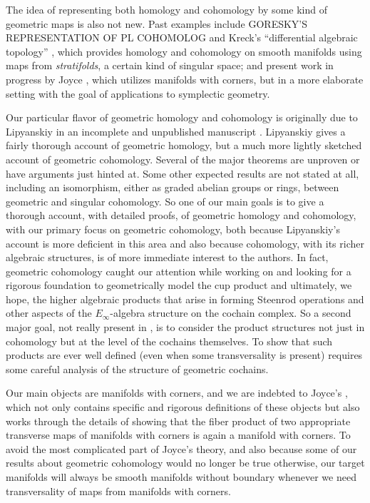 The idea of representing both homology and cohomology by some kind of geometric maps is also not new.
Past examples include GORESKY'S REPRESENTATION OF PL COHOMOLOG and Kreck's ``differential algebraic topology'' \cite{Krec10}, which provides homology and cohomology on smooth manifolds using maps from \textit{stratifolds}, a certain kind of singular space; and present work in progress by Joyce \cite{Joyc15}, which utilizes manifolds with corners, but in a more elaborate setting with the goal of applications to symplectic geometry.

Our particular flavor of geometric homology and cohomology is originally due to Lipyanskiy in an incomplete and unpublished manuscript \cite{Lipy14}.
Lipyanskiy gives a fairly thorough account of geometric homology, but a much more lightly sketched account of geometric cohomology.
Several of the major theorems are unproven or have arguments just hinted at.
Some other expected results are not stated at all, including an isomorphism, either as graded abelian groups or rings, between geometric and singular cohomology.
So one of our main goals is to give a thorough account, with detailed proofs, of geometric homology and cohomology, with our primary focus on geometric cohomology, both because Lipyanskiy's account is more deficient in this area and also because cohomology, with its richer algebraic structures, is of more immediate interest to the authors.
In fact, geometric cohomology caught our attention while working on \cite{FMS-flows} and looking for a rigorous foundation to geometrically model the cup product and ultimately, we hope, the higher algebraic products that arise in forming Steenrod operations and other aspects of the $E_\infty$-algebra structure on the cochain complex.
So a second major goal, not really present in \cite{Lipy14}, is to consider the product structures not just in cohomology but at the level of the cochains themselves.
To show that such products are ever well defined (even when some transversality is present) requires some careful analysis of the structure of geometric cochains.

Our main objects are manifolds with corners, and we are indebted to Joyce's \cite{Joy12}, which not only contains specific and rigorous definitions of these objects but also works through the details of showing that the fiber product of two appropriate transverse maps of manifolds with corners is again a manifold with corners.
To avoid the most complicated part of Joyce's theory, and also because some of our results about geometric cohomology would no longer be true otherwise,
our target manifolds will always be smooth manifolds without boundary whenever we need transversality of maps from manifolds with corners.

